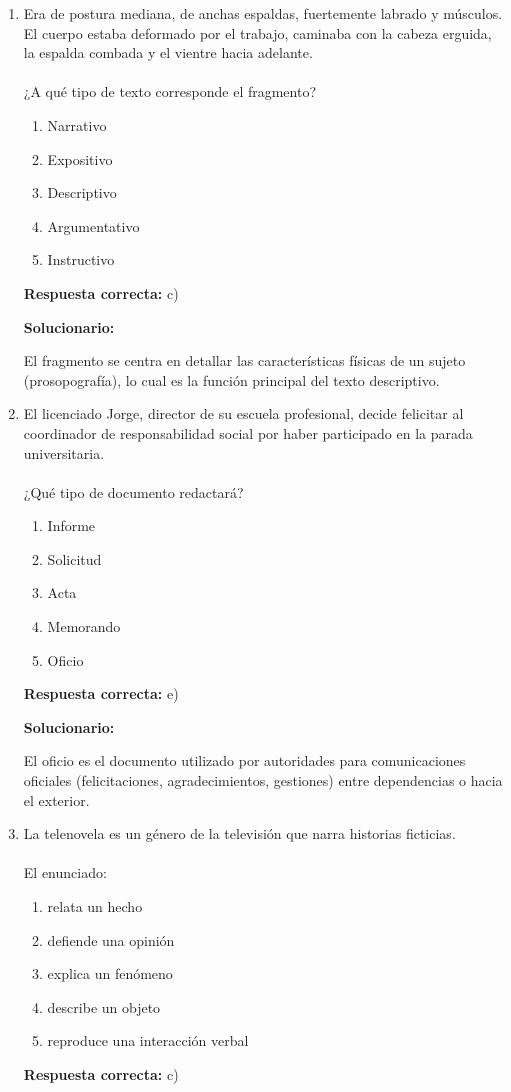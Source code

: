 \begin{enumerate}[resume]
	\item Era de postura mediana, de anchas espaldas, fuertemente labrado y músculos. El cuerpo estaba deformado por el trabajo, caminaba con la cabeza erguida, la espalda combada y el vientre hacia adelante.\\
	\\
	¿A qué tipo de texto corresponde el fragmento?
	\begin{enumerate}[label=\alph*)]
		\item Narrativo
		\item Expositivo
		\item Descriptivo
		\item Argumentativo
		\item Instructivo
	\end{enumerate}
	\textbf{Respuesta correcta:} c)

	\vspace{2mm}
	\textbf{Solucionario:}

	El fragmento se centra en detallar las características físicas de un sujeto (prosopografía), lo cual es la función principal del texto descriptivo.

	\vspace{6mm}

	\item El licenciado Jorge, director de su escuela profesional, decide felicitar al coordinador de responsabilidad social por haber participado en la parada universitaria.\\
	\\
	¿Qué tipo de documento redactará?
	\begin{enumerate}[label=\alph*)]
		\item Informe
		\item Solicitud
		\item Acta
		\item Memorando
		\item Oficio
	\end{enumerate}
	\textbf{Respuesta correcta:} e)

	\vspace{2mm}
	\textbf{Solucionario:}

	El oficio es el documento utilizado por autoridades para comunicaciones oficiales (felicitaciones, agradecimientos, gestiones) entre dependencias o hacia el exterior.

	\vspace{6mm}

	\item La telenovela es un género de la televisión que narra historias ficticias.\\
	\\
	El enunciado:
	\begin{enumerate}[label=\alph*)]
		\item relata un hecho
		\item defiende una opinión
		\item explica un fenómeno
		\item describe un objeto
		\item reproduce una interacción verbal
	\end{enumerate}
	\textbf{Respuesta correcta:} c)


\end{enumerate}
